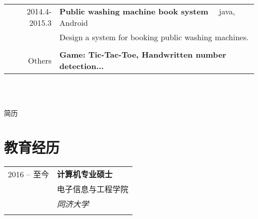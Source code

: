 \documentclass[10pt]{article} %
\begin{document}
{\begin{supertabular}{rl}
2014.4-2015.3
& \textbf{Public washing machine book system} ~~java, Android\\
& Design a system for booking public washing machines. \\
& \\

Others
& \textbf{Game: Tic-Tac-Toe, Handwritten number detection...}\\


\end{supertabular}\\[10pt]


\color{text1} %


\par{\\ %
{\color{headings} 简历} %
	

\begin{minipage}[t]{0.5\textwidth} %
\vspace{0pt} %
	

\section{教育经历} 

\begin{tabular}{rl} %


2016 -- \textsc{至今} & \textbf{计算机专业硕士} \\ 
& \textsc{电子信息与工程学院} \\ 
& \textit{同济大学}\\
&\\


\end{tabular}
\end{minipage}}}
\end{document}
